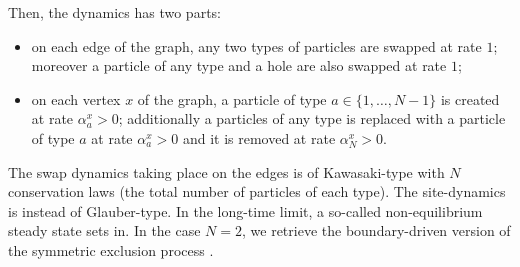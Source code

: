 \documentclass[10pt]{article}
\numberwithin{equation}{section}
\numberwithin{equation}{subsection}
\newtheorem{remark}{Remark}
\begin{document}
Then, the dynamics has two parts: 
\begin{itemize}
\item
on each edge of the graph, any two types of particles are swapped at rate $1$;
moreover a particle of any type and a hole are also swapped at rate $1$; 
\item
on each vertex $x$ of the graph, a particle of type $a \in \{1,\ldots,N-1\}$ is created  at rate $\alpha_a^x >0$;
additionally a particles of any type is replaced with a
particle of type $a$ at rate $\alpha_a^x >0$ and it is removed at rate $\alpha_N^x >0$.
\end{itemize}
The swap dynamics taking place on the edges is of Kawasaki-type 
with $N$ conservation laws
(the total number of particles of each type). 
The site-dynamics is instead of Glauber-type. 
In the long-time limit, a so-called non-equilibrium
steady state sets in.
In the case $N=2$, we retrieve the  boundary-driven version of the symmetric exclusion process \cite{schutzSandow,carinci2013duality}.
%
%
\end{document}
